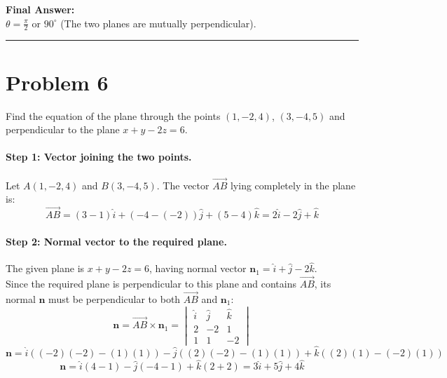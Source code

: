 \documentclass[11pt,a4paper]{article}
\begin{document}
\begin{resultbox}
\textbf{Final Answer:}\\
$\boxed{\theta = \frac{\pi}{2} \text{ or } 90^\circ}$ \quad (The two planes are mutually perpendicular).
\end{resultbox}

\vspace{0.4cm}
\hrule
\vspace{0.4cm}

\section{Problem 6}
\begin{problembox}[Problem 6]
Find the equation of the plane through the points $(1, -2, 4)$, $(3, -4, 5)$ and perpendicular to the plane $x + y - 2z = 6$.
\end{problembox}

\paragraph{Step 1: Vector joining the two points.}
Let $A(1, -2, 4)$ and $B(3, -4, 5)$. The vector $\vec{AB}$ lying completely in the plane is:
$$\vec{AB} = (3 - 1)\hat{i} + (-4 - (-2))\hat{j} + (5 - 4)\hat{k} = 2\hat{i} - 2\hat{j} + \hat{k}$$

\paragraph{Step 2: Normal vector to the required plane.}
The given plane is $x + y - 2z = 6$, having normal vector $\mathbf{n}_1 = \hat{i} + \hat{j} - 2\hat{k}$.\\
Since the required plane is perpendicular to this plane and contains $\vec{AB}$, its normal $\mathbf{n}$ must be perpendicular to both $\vec{AB}$ and $\mathbf{n}_1$:
$$\mathbf{n} = \vec{AB} \times \mathbf{n}_1 = \begin{vmatrix} \hat{i} & \hat{j} & \hat{k} \\ 2 & -2 & 1 \\ 1 & 1 & -2 \end{vmatrix}$$
$$\mathbf{n} = \hat{i}((-2)(-2) - (1)(1)) - \hat{j}((2)(-2) - (1)(1)) + \hat{k}((2)(1) - (-2)(1))$$
$$\mathbf{n} = \hat{i}(4 - 1) - \hat{j}(-4 - 1) + \hat{k}(2 + 2) = 3\hat{i} + 5\hat{j} + 4\hat{k}$$
\end{document}
